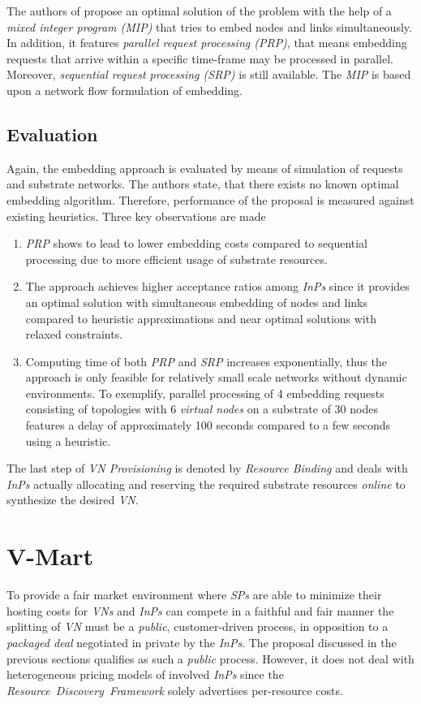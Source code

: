 \documentclass[prodmode,acmtomccap]{acmlarge}
\begin{document}
The authors of  propose an optimal solution of the problem with the help of a \emph{mixed integer program (MIP)} that tries to embed nodes and links simultaneously. In addition,
it features \emph{parallel request processing (PRP)}, that means embedding requests that arrive within a specific time-frame may be processed in parallel. Moreover,
\emph{sequential request processing (SRP)} is still available.
The \emph{MIP} is based upon a network flow formulation of embedding.

\subsection{Evaluation}
Again, the embedding approach is evaluated by means of simulation of requests and substrate networks. The authors state, that there exists no known optimal embedding algorithm. Therefore, performance of the proposal
is measured against existing heuristics. Three key observations are made

\begin{enumerate}
	\item \emph{PRP} shows to lead to lower embedding costs compared to sequential processing due to more efficient usage of substrate resources.
	\item  The approach achieves higher acceptance ratios among \emph{InPs} since it provides an optimal solution with simultaneous embedding of nodes and links
		compared to heuristic approximations and near optimal solutions with relaxed constraints.
	\item Computing time of both \emph{PRP} and \emph{SRP} increases exponentially, thus the approach is only feasible for relatively small scale networks without dynamic environments.
		To exemplify, parallel processing of 4 embedding requests consisting of topologies with 6 \emph{virtual nodes} on a substrate of 30 nodes features a delay of approximately 100 seconds
		compared to a few seconds using a heuristic.
\end{enumerate}

The last step of \emph{VN Provisioning} is denoted by \emph{Resource Binding} and deals with \emph{InPs} actually allocating and reserving the required substrate resources \emph{online} to synthesize
the desired \emph{VN}.

\section{V-Mart}
\label{sec:vmart}
To provide a fair market environment where \emph{SPs} are able to minimize their hosting costs for \emph{VNs} and \emph{InPs} can compete in a faithful and fair manner
the splitting of \emph{VN} must be a \emph{public}, customer-driven process, in opposition to a \emph{packaged deal} negotiated in private by the \emph{InPs}.
The proposal discussed in the previous sections qualifies as such a \emph{public} process. However, it does not deal with heterogeneous pricing models of involved \emph{InPs} since
the \emph{Resource~Discovery~Framework} solely advertises per-resource costs.
\end{document}
